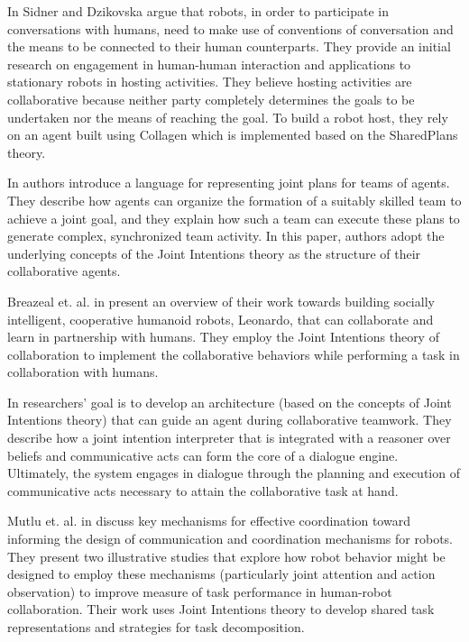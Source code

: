 \documentclass[11pt]{article}
\begin{document}
In \cite{sidner:enagagement-robot} Sidner and Dzikovska argue that robots, in
order to participate in conversations with humans, need to make use of
conventions of conversation and the means to be connected to their human
counterparts. They provide an initial research on engagement in human-human
interaction and applications to stationary robots in hosting activities. They
believe hosting activities are collaborative because neither party completely
determines the goals to be undertaken nor the means of reaching the goal. To
build a robot host, they rely on an agent built using Collagen which is
implemented based on the SharedPlans theory.

In \cite{kinny:planned-team} authors introduce a language for representing joint
plans for teams of agents. They describe how agents can organize the formation
of a suitably skilled team to achieve a joint goal, and they explain how such a
team can execute these plans to generate complex, synchronized team activity. In
this paper, authors adopt the underlying concepts of the Joint Intentions theory
as the structure of their collaborative agents.

Breazeal et. al. in \cite{breazeal:humanoid-robots} present an overview of their
work towards building socially intelligent, cooperative humanoid robots,
Leonardo, that can collaborate and learn in partnership with humans. They employ
the Joint Intentions theory of collaboration to implement the collaborative
behaviors while performing a task in collaboration with humans.

In \cite{subramanian:joint-intention-dialogue} researchers' goal is to develop
an architecture (based on the concepts of Joint Intentions theory) that can
guide an agent during collaborative teamwork. They describe how a joint
intention interpreter that is integrated with a reasoner over beliefs and
communicative acts can form the core of a dialogue engine. Ultimately, the
system engages in dialogue through the planning and execution of communicative
acts necessary to attain the collaborative task at hand.

Mutlu et. al. in \cite{mutlu:coordination-robot} discuss key mechanisms for
effective coordination toward informing the design of communication and
coordination mechanisms for robots. They present two illustrative studies that
explore how robot behavior might be designed to employ these mechanisms
(particularly joint attention and action observation) to improve measure of task
performance in human-robot collaboration. Their work uses Joint Intentions
theory to develop shared task representations and strategies for task
decomposition.
\end{document}
